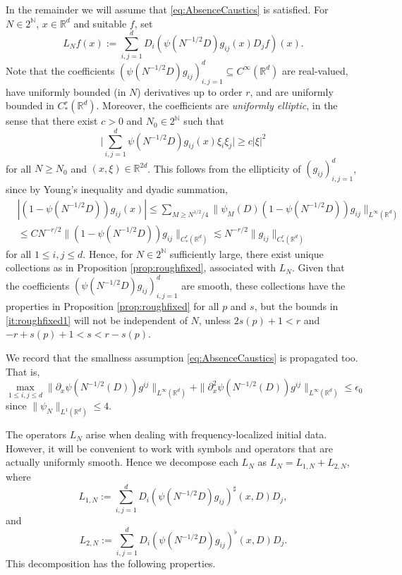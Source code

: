\documentclass{amsart}
\numberwithin{equation}{section}
\theoremstyle{definition}
\newcommand{\R}{\mathbb{R}}
\newcommand{\Rd}{\mathbb{R}^{d}}
\newcommand{\N}{\mathbb{N}}
\begin{document}
In the remainder we will assume that \eqref{eq:AbsenceCaustics} is satisfied.
For $N\in 2^{\N}$, $x\in\Rd$ and suitable $f$, set 
\[
L_{N}f(x):=\sum_{i,j=1}^{d}D_{i}(\psi(N^{-1/2}D)g_{ij}(x)D_{j}f)(x).
\]
Note that the coefficients $(\psi(N^{-1/2}D)g_{ij})_{i,j=1}^{d}\subseteq C^{\infty}(\Rd)$ are real-valued, have uniformly bounded (in $N$) derivatives up to order $r$, and are uniformly bounded in $C^{r}_{*}(\Rd)$. Moreover, the coefficients are \emph{uniformly elliptic}, in the sense that 
there exist $c>0$ and $N_{0}\in 2^{\N}$ such that 
\[
\Big|\sum_{i,j=1}^{d}\psi(N^{-1/2}D)g_{ij}(x)\xi_{i}\xi_{j}\Big|\geq c|\xi|^{2}
\]
for all $N\geq N_{0}$ and $(x,\xi)\in\R^{2d}$. This follows from the ellipticity of $(g_{ij})_{i,j=1}^{d}$, since by Young's inequality and dyadic summation, 
\begin{align*}
&|(1-\psi(N^{-1/2}D))g_{ij}(x)|%
\leq \sum_{M\geq N^{1/2}/4}\|\psi_{M}(D)(1-\psi(N^{-1/2}D))g_{ij}\|_{L^{\infty}(\Rd)}\\
&\leq C N^{-r/2}\|(1-\psi(N^{-1/2}D))g_{ij}\|_{C^{r}_{*}(\Rd)}\lesssim N^{-r/2}\|g_{ij}\|_{C^{r}_{*}(\Rd)}
\end{align*}
for all %
$1\leq i,j\leq d$. 
Hence, for $N\in 2^{\N}$ sufficiently large, there exist unique collections %
as in Proposition \ref{prop:roughfixed}, associated with $L_{N}$. Given that the coefficients $(\psi(N^{-1/2}D)g_{ij})_{i,j=1}^{d}$ are smooth, these collections have the properties in Proposition \ref{prop:roughfixed} for all $p$ and $s$, but the bounds in \eqref{it:roughfixed1} will not be independent of $N$, unless $2s(p)+1<r$ and $-r+s(p)+1<s<r-s(p)$. %

We record that the smallness assumption \eqref{eq:AbsenceCaustics} is propagated too. That is,
\begin{equation*}
\max_{1\leq i,j\leq d}    \| \partial_x \psi(N^{-1/2}(D)) g^{ij} \|_{L^\infty(\Rd)} + \| \partial^2_x \psi(N^{-1/2}(D)) g^{ij} \|_{L^\infty(\Rd)} \leq \epsilon_0
\end{equation*}
since $\| \psi_N\|_{L^1(\Rd)} \leq 4$.

The operators $L_{N}$ arise when dealing with frequency-localized initial data. However, it will be convenient to work with symbols and operators that are actually uniformly smooth. Hence we decompose each $L_{N}$ as $L_{N}=L_{1,N}+L_{2,N}$, where
\[
L_{1,N}:=\sum_{i,j=1}^{d}D_{i}(\psi(N^{-1/2}D)g_{ij})^{\sharp}(x,D)D_{j},
\]
and 
\[
L_{2,N}:=\sum_{i,j=1}^{d}D_{i}(\psi(N^{-1/2}D)g_{ij})^{\flat}(x,D)D_{j}.
\]
This decomposition has the following properties.
\end{document}
